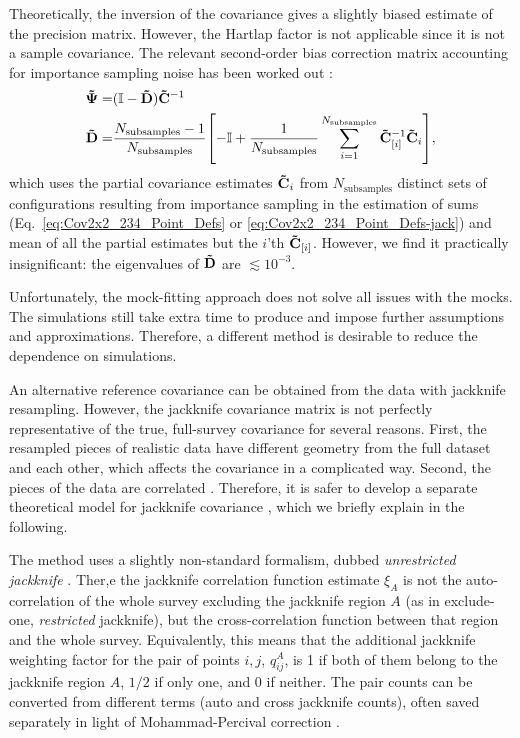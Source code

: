 Theoretically, the inversion of the \rascalc{} covariance gives a slightly biased estimate of the precision matrix.
However, the Hartlap factor \citep{hartlap-factor} is not applicable since it is not a sample covariance.
The relevant second-order bias correction matrix accounting for importance sampling noise has been worked out \citep{rascal-jackknife}:
\begin{align} \label{eq:bias-correction}
{\bf \tilde \Psi} =& ({\bf \mathbb I} - {\bf \tilde D}) {\bf \tilde C}^{-1} \\ \nonumber
{\bf \tilde D} =& \frac{N_\mathrm{subsamples}-1}{N_\mathrm{subsamples}} {\left[ -{\bf \mathbb{I}}+\frac{1}{N_\mathrm{subsamples}}\sum_{i=1}^{N_\mathrm{subsamples}} {\bf \tilde C}_{[i]}^{-1} {\bf \tilde C}_i \right]},
\end{align}
which uses the partial covariance estimates ${\bf \tilde C}_i$ from $N_\mathrm{subsamples}$ distinct sets of configurations resulting from importance sampling in the estimation of sums (Eq.~\eqref{eq:Cov2x2_234_Point_Defs} or \eqref{eq:Cov2x2_234_Point_Defs-jack}) and mean of all the partial estimates but the $i$'th ${\bf \tilde C}_{[i]}$.
However, we find it practically insignificant: the eigenvalues of ${\bf \tilde D}$ are $\lesssim 10^{-3}$.

Unfortunately, the mock-fitting approach does not solve all issues with the mocks.
The simulations still take extra time to produce and impose further assumptions and approximations.
Therefore, a different method is desirable to reduce the dependence on simulations.


An alternative reference covariance can be obtained from the data with jackknife resampling.
However, the jackknife covariance matrix is not perfectly representative of the true, full-survey covariance for several reasons.
First, the resampled pieces of realistic data have different geometry from the full dataset and each other, which affects the covariance in a complicated way.
Second, the pieces of the data are correlated \citep{MP21,fitted-jk}.
Therefore, it is safer to develop a separate theoretical model for jackknife covariance \citep{rascal-jackknife}, which we briefly explain in the following.

The method uses a slightly non-standard formalism, dubbed {\it unrestricted jackknife} \citep{rascalC}.
Ther,e the jackknife correlation function estimate $\xi_A$ is not the auto-correlation of the whole survey excluding the jackknife region $A$ (as in exclude-one, {\it restricted} jackknife), but the cross-correlation function between that region and the whole survey.
Equivalently, this means that the additional jackknife weighting factor for the pair of points $i,j$, $q^A_{ij}$, is 1 if both of them belong to the jackknife region $A$, $1/2$ if only one, and 0 if neither.
The pair counts can be converted from different terms (auto and cross jackknife counts), often saved separately in light of Mohammad-Percival correction \citep{MP21}.

